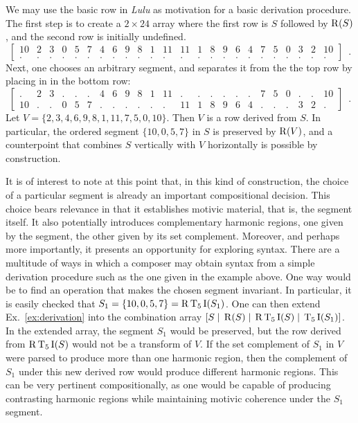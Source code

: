 \begin{example}
	\label{ex:derivation}
	We may use the basic row in \emph{Lulu} as motivation for a basic derivation procedure. The first step is to create a $2 \times 24$ array where the first row is $S$ followed by $\operatorname{R}(S)$, and the second row is initially undefined.
	\begin{equation}
    	\left[
    	\begin{array}{cccccccccccc|cccccccccccc}
        	10 & 2 & 3 & 0 & 5 & 7 & 4 & 6 & 9 & 8 & 1 & 11 & 11 & 1 & 8 & 9 & 6 & 4 & 7 & 5 & 0 & 3 & 2 & 10 \\
        	. & . & . & . & . & . & . & . & . & . & . & . & . & . & . & . & . & . & . & . & . & . & . & .
    	\end{array}
    	\right] \enspace.
	\end{equation}
	Next, one chooses an arbitrary segment, and separates it from the the top row by placing in in the bottom row:
	\begin{equation}
    	\left[
    	\begin{array}{cccccccccccc|cccccccccccc}
        	. & 2 & 3 & . & . & . & 4 & 6 & 9 & 8 & 1 & 11 & . & . & . & . & . & . & 7 & 5 & 0 & . & . & 10 \\
        	10 & . & . & 0 & 5 & 7 & . & . & . & . & . & . & 11 & 1 & 8 & 9 & 6 & 4 & . & . & . & 3 & 2 & .
    	\end{array}
    	\right] \enspace.
	\end{equation}
	Let $V = \{ 2, 3, 4, 6, 9, 8, 1, 11, 7, 5, 0, 10 \}$. Then $V$ is a row derived from $S$. In particular, the ordered segment $\{ 10, 0, 5, 7 \}$ in $S$ is preserved by $\operatorname{R}(V)$, and a counterpoint that combines $S$ vertically with $V$ horizontally is possible by construction.
\end{example}

It is of interest to note at this point that, in this kind of construction, the choice of a particular segment is already an important compositional decision. This choice bears relevance in that it establishes motivic material, that is, the segment itself. It also potentially introduces complementary harmonic regions, one given by the segment, the other given by its set complement. Moreover, and perhaps more importantly, it presents an opportunity for exploring syntax. There are a multitude of ways in which a composer may obtain syntax from a simple derivation procedure such as the one given in the example above. One way would be to find an operation that makes the chosen segment invariant. In particular, it is easily checked that $S_1 = \{ 10, 0, 5, 7 \} = \operatorname{R}\operatorname{T}_5\operatorname{I}(S_1)$. One can then extend Ex.~\ref{ex:derivation} into the combination array $[S \; | \; \operatorname{R}(S) \; | \; \operatorname{R}\operatorname{T}_5\operatorname{I}(S) \; | \; \operatorname{T}_5\operatorname{I}(S_1)]$. In the extended array, the segment $S_1$ would be preserved, but the row derived from $\operatorname{R}\operatorname{T}_5\operatorname{I}(S)$ would not be a transform of $V$. If the set complement of $S_1$ in $V$ were parsed to produce more than one harmonic region, then the complement of $S_1$ under this new derived row would produce different harmonic regions. This can be very pertinent compositionally, as one would be capable of producing contrasting harmonic regions while maintaining motivic coherence under the $S_1$ segment.

